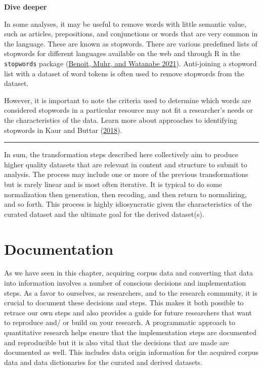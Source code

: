 \documentclass[
  letterpaper,
  DIV=11,
  numbers=noendperiod]{scrreport}
\theoremstyle{definition}
\theoremstyle{remark}
\begin{document}
\begin{tcolorbox}[enhanced jigsaw, leftrule=.75mm, bottomrule=.15mm, opacityback=0, breakable, left=2mm, colback=white, toprule=.15mm, arc=.35mm, rightrule=.15mm]

\textbf{ Dive deeper}

In some analyses, it may be useful to remove words with little semantic
value, such as articles, prepositions, and conjunctions or words that
are very common in the language. These are known as stopwords. There are
various predefined lists of stopwords for different languages available
on the web and through R in the \texttt{stopwords} package
(\protect\hyperlink{ref-R-stopwords}{Benoit, Muhr, and Watanabe 2021}).
Anti-joining a stopword list with a dataset of word tokens is often used
to remove stopwords from the dataset.

However, it is important to note the criteria used to determine which
words are considered stopwords in a particular resource may not fit a
researcher's needs or the characteristics of the data. Learn more about
approaches to identifying stopwords in Kaur and Buttar
(\protect\hyperlink{ref-Kaur2018}{2018}).

\end{tcolorbox}

\begin{center}\rule{0.5\linewidth}{0.5pt}\end{center}

In sum, the transformation steps described here collectively aim to
produce higher quality datasets that are relevant in content and
structure to submit to analysis. The process may include one or more of
the previous transformations but is rarely linear and is most often
iterative. It is typical to do some normalization then generation, then
recoding, and then return to normalizing, and so forth. This process is
highly idiosyncratic given the characteristics of the curated dataset
and the ultimate goal for the derived dataset(s).

\hypertarget{sec-ud-documentation}{%
\section{Documentation}\label{sec-ud-documentation}}

As we have seen in this chapter, acquiring corpus data and converting
that data into information involves a number of conscious decisions and
implementation steps. As a favor to ourselves, as researchers, and to
the research community, it is crucial to document these decisions and
steps. This makes it both possible to retrace our own steps and also
provides a guide for future researchers that want to reproduce and/ or
build on your research. A programmatic approach to quantitative research
helps ensure that the implementation steps are documented and
reproducible but it is also vital that the decisions that are made are
documented as well. This includes data origin information for the
acquired corpus data and data dictionaries for the curated and derived
datasets.
\end{document}
